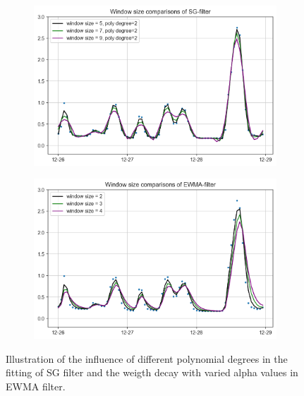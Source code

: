 \begin{figure}[h]
    \centering
    \begin{subfigure}{0.45\textwidth}
      \includegraphics[width=\linewidth]{imgs/pre-processing/sg-filter.png}
      \caption{} \label{fig:smoothed-sg}
    \end{subfigure}%
    \hspace{2em}%
    \begin{subfigure}{0.45\textwidth}
      \includegraphics[width=\linewidth]{imgs/pre-processing/ew-filter.png}
      \caption{} \label{fig:smoothed-ew}
    \end{subfigure}%
  \caption{Illustration of the influence of different polynomial degrees in the fitting of SG filter and the weigth decay with varied alpha values in EWMA filter.} \label{fig:smoothed}
\end{figure}


